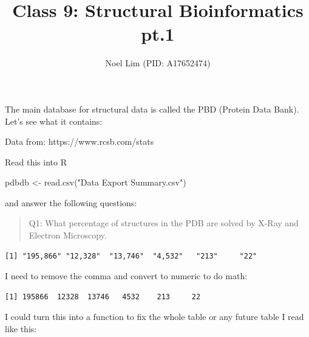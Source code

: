 \documentclass[
  letterpaper,
  DIV=11,
  numbers=noendperiod]{scrartcl}
\title{Class 9: Structural Bioinformatics pt.1}
\author{Noel Lim (PID: A17652474)}
\date{}
\newenvironment{Shaded}{\begin{snugshade}}{\end{snugshade}}
\newcommand{\FunctionTok}[1]{\textcolor[rgb]{0.28,0.35,0.67}{#1}}
\newcommand{\NormalTok}[1]{\textcolor[rgb]{0.00,0.23,0.31}{#1}}
\newcommand{\OtherTok}[1]{\textcolor[rgb]{0.00,0.23,0.31}{#1}}
\newcommand{\SpecialCharTok}[1]{\textcolor[rgb]{0.37,0.37,0.37}{#1}}
\newcommand{\StringTok}[1]{\textcolor[rgb]{0.13,0.47,0.30}{#1}}
\begin{document}
\maketitle


The main database for structural data is called the PBD (Protein Data
Bank). Let's see what it contains:

Data from: https://www.rcsb.com/stats

Read this into R

\begin{Shaded}
\begin{Highlighting}[]
\NormalTok{pdbdb }\OtherTok{\textless{}{-}} \FunctionTok{read.csv}\NormalTok{(}\StringTok{"Data Export Summary.csv"}\NormalTok{)}
\end{Highlighting}
\end{Shaded}

and answer the following questions:

\begin{quote}
Q1: What percentage of structures in the PDB are solved by X-Ray and
Electron Microscopy.
\end{quote}

\begin{Shaded}
\end{Shaded}

\begin{verbatim}
[1] "195,866" "12,328"  "13,746"  "4,532"   "213"     "22"     
\end{verbatim}

I need to remove the comma and convert to numeric to do math:

\begin{Shaded}
\end{Shaded}

\begin{verbatim}
[1] 195866  12328  13746   4532    213     22
\end{verbatim}

I could turn this into a function to fix the whole table or any future
table I read like this:
\end{document}
